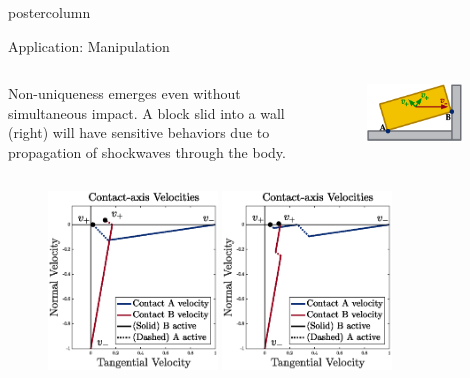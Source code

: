\documentclass[final,hyperref={pdfpagelabels=false},5pt]{beamer}
\begin{document}
\begin{frame}
\begin{columns}
\begin{column}{.49\textwidth}
\begin{beamercolorbox}[center,wd=\textwidth]{postercolumn}
\begin{minipage}[T]{.95\textwidth}
{\begin{block}{Application: Manipulation}
\begin{columns}[c]
				\begin{column}{.47\hsize}
				\justify
				Non-uniqueness emerges even without simultaneous impact. A block slid into a wall (right) will have sensitive behaviors due to propagation of shockwaves through the body.
				\end{column}
				\begin{column}{.47\hsize}
				\centering
				\vspace{0ex}
				\begin{figure}
				\centering
              	\includegraphics[width=0.9\textwidth]{PushingFinal}
              	\end{figure} 
				\end{column}
				\end{columns}
				\begin{figure}
					\includegraphics[width=0.4\textwidth]{pushing_example_1}
					\hspace{0.06\textwidth}
					\includegraphics[width=0.4\textwidth]{pushing_example_2}
				\end{figure}
            \end{block}
            
}
\end{minipage}
\end{beamercolorbox}
\end{column}
\end{columns}
\end{frame}
\end{document}
